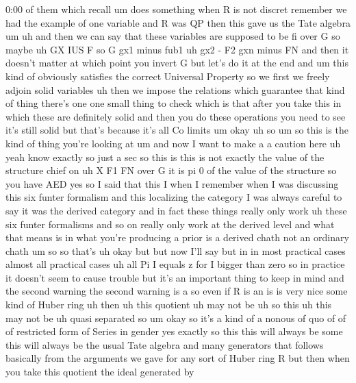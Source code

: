 \begin{unfinished}{0:00}
of
them  which  recall  um  does  something  when
R  is  not  discret  remember  we  had  the
example  of  one  variable  and  R  was  QP
then  this  gave  us  the  Tate  algebra
um  uh  and  then  we  can  say  that  these
variables  are  supposed  to  be  fi  over  G
so  maybe  uh  GX  IUS  F  so  G  gx1  minus  fub1
uh  gx2  -
F2  gxn  minus  FN  and  then  it  doesn't
matter  at  which  point  you  invert  G  but
let's  do  it  at  the
end  and  um  this  kind  of  obviously
satisfies  the  correct  Universal  Property
so  we  first  we  freely  adjoin  solid
variables  uh  then  we  impose  the
relations  which  guarantee  that  kind  of
thing  there's  one  one  small  thing  to
check  which  is  that  after  you  take  this
in  which  these  are  definitely  solid  and
then  you  do  these  operations  you  need  to
see  it's  still  solid  but  that's  because
it's  all  Co
limits
um
okay  uh
so  um  so  this  is  the  kind  of  thing
you're  looking
at  um  and  now  I  want  to  make  a  a  caution
here
uh  yeah  know  exactly  so  just  a  sec  so
this  is  this  is  not
exactly  the  value  of  the  structure
chief  on  uh  X  F1  FN  over
G  it
is  pi  0  of  the  value  of  the  structure
so  you  have
AED  yes  so  I  said  that  this  I  when  I
remember  when  I  was  discussing  this  six
funter  formalism  and  this  localizing  the
category  I  was  always  careful  to  say  it
was  the  derived  category  and  in  fact
these  things  really  only  work  uh  these
six  funter  formalisms  and  so  on  really
only  work  at  the  derived  level  and  what
that  means  is  in  what  you're
producing  a  prior  is  a  derived  chath  not
an  ordinary
chath  um  so  so  that's  uh  okay  but  but
now  I'll  say  but  in  in  most  practical
cases  almost  all  practical
cases  uh  all  Pi  I  equals  z  for  I  bigger
than
zero  so  in  practice  it  doesn't  seem  to
cause  trouble  but  it's  an  important
thing  to  keep  in  mind  and  the  second
warning
the  second  warning  is
a  so  even
if  R  is  an  is  is  very  nice  some  kind  of
Huber
ring  uh  then  uh  this  quotient  uh  may  not
be
uh  so  this  uh
this  may  not  be  uh  quasi
separated  so  um  okay  so  it's  a  kind  of  a
nonous  of  quo  of  of  of  restricted  form
of  Series  in  gender  yes  exactly  so  this
this  will  always  be  some  this  will
always  be  the  usual  Tate  algebra  and
many  generators  that  follows  basically
from  the  arguments  we  gave  for  any  sort
of  Huber  ring  R  but  then  when  you  take
this  quotient  the  ideal  generated  by

\end{unfinished}
